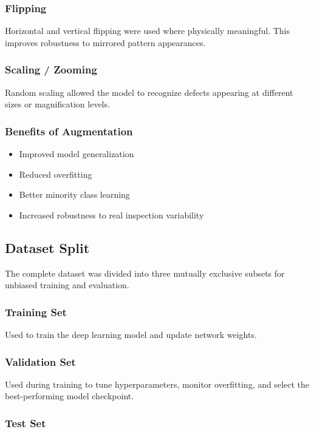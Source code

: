  \subsubsection{Flipping}

Horizontal and vertical flipping were used where physically meaningful. This improves robustness to mirrored pattern appearances.

 \subsubsection{Scaling / Zooming}

Random scaling allowed the model to recognize defects appearing at different sizes or magnification levels.

\subsubsection{Benefits of Augmentation}
\begin{itemize}
\item Improved model generalization
\item Reduced overfitting
\item Better minority class learning
\item Increased robustness to real inspection variability
\end{itemize}

\subsection{Dataset Split}

The complete dataset was divided into three mutually exclusive subsets for unbiased training and evaluation.

\subsubsection {Training Set}

Used to train the deep learning model and update network weights.

\subsubsection{Validation Set}

Used during training to tune hyperparameters, monitor overfitting, and select the best-performing model checkpoint.

\subsubsection {Test Set}

